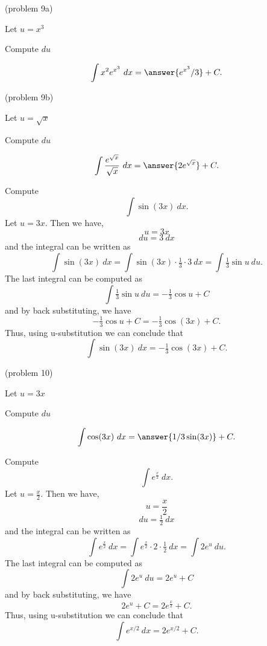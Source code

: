 \documentclass[handout]{ximera}
\begin{document}
\begin{problem}(problem 9a)
\begin{hint}
Let $u = x^3$
\end{hint}
\begin{hint}
Compute $du$
\end{hint}
\[\int x^2e^{x^3} \ dx = \answer{e^{x^3}/3} +C.\]
\end{problem}



\begin{problem}(problem 9b)
\begin{hint}
Let $u = \sqrt x$
\end{hint}
\begin{hint}
Compute $du$
\end{hint}
\[\int \frac{e^{\sqrt x}}{\sqrt x} \ dx = \answer{2e^{\sqrt x}} +C.\]
\end{problem}



\begin{example}[example 10] Compute 
\[\int \sin(3x) \ dx.\]
Let $u = 3x$.  Then we have,
\[u = 3x\]
\[du = 3 \ dx\]
and the integral can be written as 
\[\int\sin(3x) \ dx =  \int \sin(3x) \cdot \tfrac13\cdot 3 \   dx =   \int \tfrac13 \sin u \ du.\]
The last integral can be computed as 
\[ \int \tfrac13 \sin u \ du = -\tfrac13 \cos u  + C\]
and by back substituting, we have 
\[-\tfrac13 \cos u + C = -\tfrac13 \cos(3x) + C.\]
Thus, using u-substitution we can conclude that
\[\int \sin(3x) \ dx =  -\tfrac13 \cos(3x) + C.\]
\end{example}



\begin{problem}(problem 10)
\begin{hint}
Let $u = 3x$
\end{hint}
\begin{hint}
Compute $du$
\end{hint}
\[\int \cos(3x) \ dx = \answer{1/3 \sin(3x)} +C.\]
\end{problem}






\begin{example}[example 11] Compute 
\[\int e^{\frac{x}{2}} \ dx.\]
Let $u = \frac{x}{2}$.  Then we have,
\[u = \frac{x}{2}\]
\[du = \tfrac12 \ dx\]
and the integral can be written as 
\[\int e^{\frac{x}{2}} \ dx =  \int e^{\frac{x}{2}} \cdot 2\cdot \tfrac{1}{2}  \   dx =   \int 2e^u \ du.\]
The last integral can be computed as 
\[\int 2e^u \ du = 2 e^u + C\]
and by back substituting, we have 
\[2e^u + C = 2e^{\frac{x}{2}}+ C.\]
Thus, using u-substitution we can conclude that
\[\int e^{x/2} \ dx = 2e^{x/2} + C.\]
\end{example}
\end{document}
